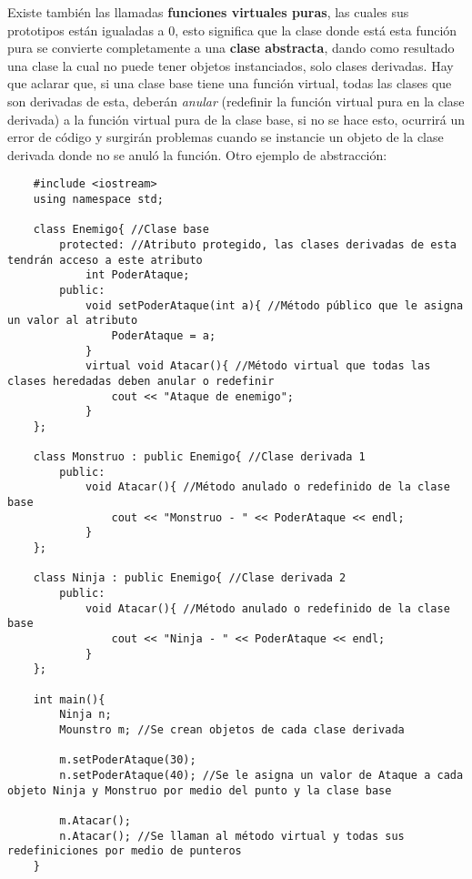 Existe también las llamadas \textbf{funciones virtuales puras}, las cuales sus prototipos están igualadas a 0, esto significa que la clase donde está esta función pura se convierte completamente a una \textbf{clase abstracta}, dando como resultado una clase la cual no puede tener objetos instanciados, solo clases derivadas. Hay que aclarar que, si una clase base tiene una función virtual, todas las clases que son derivadas de esta, deberán \textit{anular} (redefinir la función virtual pura en la clase derivada) a la función virtual pura de la clase base, si no se hace esto, ocurrirá un error de código y surgirán problemas cuando se instancie un objeto de la clase derivada donde no se anuló la función. Otro ejemplo de abstracción:
\begin{lstlisting}
    #include <iostream>
    using namespace std;
    
    class Enemigo{ //Clase base
        protected: //Atributo protegido, las clases derivadas de esta tendrán acceso a este atributo
            int PoderAtaque;
        public:
            void setPoderAtaque(int a){ //Método público que le asigna un valor al atributo
                PoderAtaque = a;
            }
            virtual void Atacar(){ //Método virtual que todas las clases heredadas deben anular o redefinir
                cout << "Ataque de enemigo";
            }
    };
    
    class Monstruo : public Enemigo{ //Clase derivada 1
        public:
            void Atacar(){ //Método anulado o redefinido de la clase base
                cout << "Monstruo - " << PoderAtaque << endl;
            }
    };
    
    class Ninja : public Enemigo{ //Clase derivada 2
        public:
            void Atacar(){ //Método anulado o redefinido de la clase base
                cout << "Ninja - " << PoderAtaque << endl;
            }
    };
    
    int main(){
        Ninja n;
        Mounstro m; //Se crean objetos de cada clase derivada
        
        m.setPoderAtaque(30);
        n.setPoderAtaque(40); //Se le asigna un valor de Ataque a cada objeto Ninja y Monstruo por medio del punto y la clase base
        
        m.Atacar();
        n.Atacar(); //Se llaman al método virtual y todas sus redefiniciones por medio de punteros
    }
\end{lstlisting}
